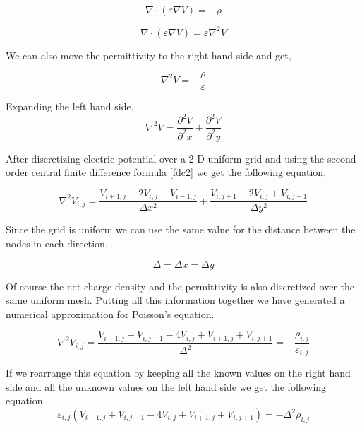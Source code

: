 \begin{equation}
\nabla \cdot  (\varepsilon \nabla V)=-\rho
\end{equation}

\begin{equation}
\nabla \cdot  (\varepsilon \nabla V)=\varepsilon  \nabla^2 V
\end{equation}

We can also move the permittivity to the right hand side and get,

\begin{equation}
 \nabla^2 V =-\frac{\rho}{\varepsilon}
\end{equation}

Expanding the left hand side,
\begin{equation}
 \nabla^2 V =\frac{\partial^2 V}{\partial^2 x}+\frac{\partial^2 V}{\partial^2 y}
\end{equation}

After discretizing electric potential over a 2-D uniform grid and using the second order central finite difference formula \eqref{fdc2} we get the following equation,

\begin{equation}
 \nabla^2 V_{i,j}=\frac{V_{i+1,j}-2V_{i,j}+V_{i-1,j}}{\Delta x^2}+\frac{V_{i,j+1}-2V_{i,j}+V_{i,j-1}}{\Delta y^2}
\end{equation}

Since the grid is uniform we can use the same value for the distance between the nodes in each direction.

\begin{equation}
\Delta=\Delta x =\Delta y
\end{equation}

Of course the net charge density and the permittivity is also discretized over the same uniform mesh. Putting all this information together we have generated a numerical approximation for Poisson's equation. 

\begin{equation}
 \nabla^2 V_{i,j}=\frac{V_{i-1,j}+V_{i,j-1}-4V_{i,j}+V_{i+1,j}+V_{i,j+1}}{\Delta^2}=-\frac{\rho_{i,j}}{\varepsilon_{i,j}}
\end{equation}

If we rearrange this equation by keeping all the known values on the right hand side and all the unknown values on the left hand side we get the following equation.
\begin{equation}
\varepsilon_{i,j}(V_{i-1,j}+V_{i,j-1}-4V_{i,j}+V_{i+1,j}+V_{i,j+1})=-\Delta^2\rho_{i,j}
\label{discrete_poisson}
\end{equation}

